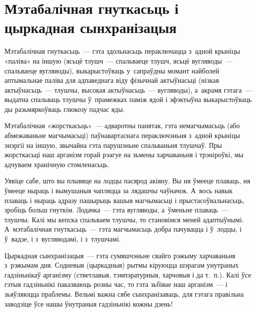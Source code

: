 \chapter[Мэтабалічная гнуткасьць і цыркадная сынхранізацыя][Мэтабалічная гнуткасьць]{Мэтабалічная гнуткасьць і цыркадная сынхранізацыя}

Мэтабалічная гнуткасьць~--- гэта здольнасьць пераключацца з~адной крыніцы «паліва» на іншую (ясьцё тлушч~--- спальваеце тлушч, ясьцё вугляводы~--- спальваеце вугляводы), выкарыстоўваць у~сапраўдны момант найболей аптымальнае паліва для адпаведнага віду фізычнай актыўнасьці (нізкая актыўнасьць~--- тлушчы, высокая актыўнасьць~--- вугляводы), а~акрамя гэтага~--- выдатна спальваць тлушчы ў~прамежках паміж ядой і эфэктыўна выкарыстоўваць ды разьмяркоўваць глюкозу падчас яды.

Мэтабалічная «жорсткасьць»~--- адваротны панятак, гэта немагчымасьць (або абмежаваньне магчымасьці) паўнавартаснага пераключэньня з~адной крыніцы энэргіі на іншую, звычайна гэта парушэньне спальваньня тлушчаў. Пры жорсткасьці наш арганізм горай рэагуе на зьмены харчаваньня і трэніроўкі, мы адчуваем хранічную стомленасьць.

Уявіце сабе, што вы плывяце на лодцы пасярод акіяну. Вы ня ўмееце плаваць, ня ўмееце ныраць і вымушаныя чапляцца за лядашчы чаўначок. А~вось навык плаваць і ныраць адразу пашырыць вашыя магчымасьці і прыстасоўвальнасьць, зробіць больш гнуткім. Лодачка~--- гэта вугляводы, а~ўменьне плаваць~--- тлушчы. Калі мы кепска спальваем тлушчы, то становімся меней адаптыўнымі. А~мэтабалічная гнуткасьць~--- гэта магчымасьць добра пачувацца і ў~лодцы, і ў~вадзе, і з~вугляводамі, і з~тлушчамі.

Цыркадная сынхранізацыя~--- гэта сумяшчэньне свайго рэжыму харчаваньня з~рэжымам дня. Содневыя (цыркадныя) рытмы кіруюцца шэрагам унутраных гадзіньнікаў арганізму (стветлавыя, тэмпэратурныя, харчовыя і да т.~п.). Калі ўсе гэтыя гадзіньнікі паказваюць розны час, то гэта зьбівае наш арганізм~--- і зьяўляюцца праблемы. Вельмі важна сябе сынхранізаваць, для гэтага правільна заводзіце ўсе нашы ўнутраныя гадзіньнікі кожны дзень!


